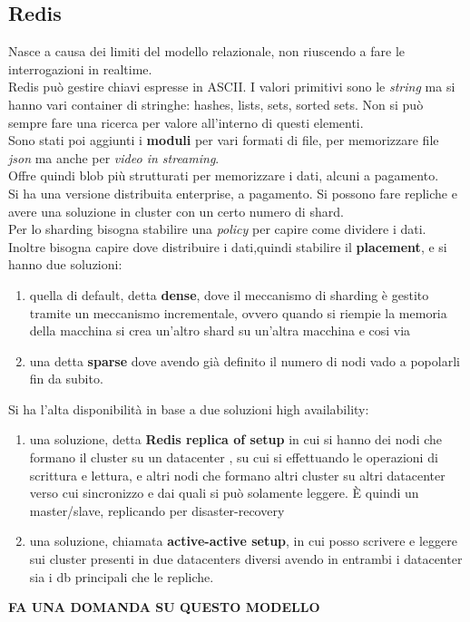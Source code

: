 \subsection{Redis} 
Nasce a causa dei limiti del modello relazionale, non riuscendo a fare le interrogazioni in realtime.\\ 
Redis può gestire chiavi espresse in ASCII. I valori primitivi sono le \textit{string} ma si hanno vari container di stringhe: hashes, lists, sets, sorted sets. 
Non si può sempre fare una ricerca per valore all'interno di questi elementi.\\ Sono stati poi aggiunti i \textbf{moduli} per vari formati di file, per memorizzare file \textit{json} ma anche per \textit{video in streaming}. \\
Offre quindi blob più strutturati per memorizzare i dati, alcuni a pagamento.\\ 
Si ha una versione distribuita enterprise, a pagamento. Si possono fare repliche e avere una soluzione in cluster con un certo numero di shard.\\ 
Per lo sharding bisogna stabilire una \textit{policy} per capire come dividere i dati. Inoltre bisogna capire dove distribuire i dati,quindi stabilire il \textbf{placement}, e si hanno due soluzioni:
\begin{enumerate}
  \item quella di default, detta \textbf{dense}, dove il meccanismo di sharding è gestito tramite un meccanismo incrementale, ovvero quando si riempie la memoria della macchina si crea un'altro shard su un'altra macchina e cosi via
  \item una detta \textbf{sparse} dove avendo già definito il numero di nodi vado a popolarli fin da subito.
\end{enumerate}
Si ha l'alta disponibilità in base a due soluzioni high availability:
\begin{enumerate}
  \item una soluzione, detta \textbf{Redis replica of setup} in cui si hanno dei nodi che formano il cluster su un datacenter , su cui si effettuando le operazioni di scrittura e lettura, e altri nodi che formano altri cluster su altri datacenter verso cui sincronizzo e dai quali si può solamente leggere. È quindi un master/slave, replicando per disaster-recovery
  \item una soluzione, chiamata \textbf{active-active setup}, in cui posso scrivere e leggere sui cluster presenti in due datacenters diversi avendo in entrambi i datacenter sia i db principali che le repliche.
\end{enumerate}

\textbf{FA UNA DOMANDA SU QUESTO MODELLO} 